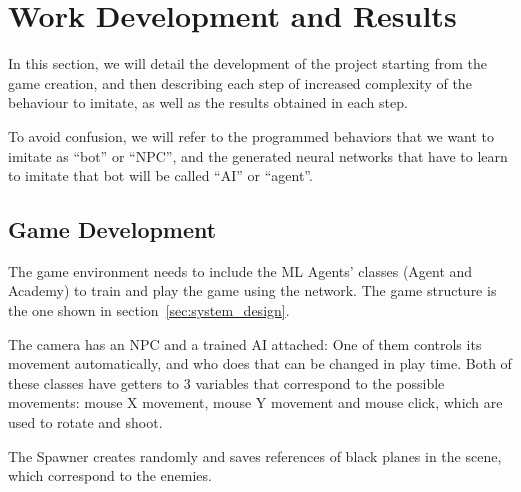 %
%
%

\chapter{Work Development and Results}

\minitoc{}

\bigskip{}

In this section, we will detail the development of the project starting from the game creation, and then describing each step of increased complexity of the behaviour to imitate, as well as the results obtained in each step. 

To avoid confusion, we will refer to the programmed behaviors that we want to imitate as ``bot'' or ``NPC'', and the generated neural networks that have to learn to imitate that bot will be called ``AI'' or ``agent''.

\section{Game Development}

The game environment needs to include the ML Agents' classes (Agent and Academy) to train and play the game using the network. The game structure is the one shown in section~\ref{sec:system_design}.

The camera has an NPC and a trained AI attached: One of them controls its movement automatically, and who does that can be changed in play time. Both of these classes have getters to 3 variables that correspond to the possible movements: mouse X movement, mouse Y movement and mouse click, which are used to rotate and shoot.

The Spawner creates randomly and saves references of black planes in the scene, which correspond to the enemies.

